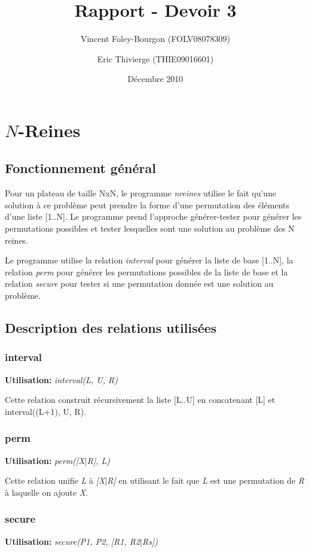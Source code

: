 \documentclass[10pt]{article}
\newcommand{\usage}[1]{\textbf{Utilisation: }\emph{#1}}
\begin{document}
\title{Rapport - Devoir 3}
\date{Décembre 2010}
\author{Vincent Foley-Bourgon (FOLV08078309) \and
    Eric Thivierge (THIE09016601)}

\maketitle

\section{$N$-Reines}

\subsection{Fonctionnement général}

Pour un plateau de taille NxN, le programme \emph{nreines} utilise le fait qu'une solution à ce problème peut prendre la forme d'une permutation des éléments d'une liste [1..N]. Le programme prend l'approche générer-tester pour générer les permutations possibles et tester lesquelles sont une solution au problème des N reines.

Le programme utilise la relation \emph{interval} pour générer la liste de base [1..N], la relation \emph{perm} pour générer les permutations possibles de la liste de base et la relation \emph{secure} pour tester si une permutation donnée est une solution au problème.

\subsection{Description des relations utilisées}

\subsubsection{interval}
\usage{interval(L, U, R)}

Cette relation construit récursivement la liste [L..U] en concatenant [L] et interval((L+1), U, R).

\subsubsection{perm}
\usage{perm([X$|$R], L)}

Cette relation unifie \emph{L} à \emph{[X$|$R]} en utilisant le fait que \emph{L} est une permutation de \emph{R} à laquelle on ajoute \emph{X}.

\subsubsection{secure}
\usage{secure(P1, P2, [R1, R2$|$Rs])}
\end{document}
